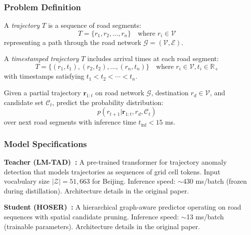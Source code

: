 \subsubsection{Problem Definition}
\label{sec:method-problem}

\begin{definition}[Trajectory]
\label{def:trajectory}
A \emph{trajectory} $T$ is a sequence of road segments:
\[
T = \{r_1, r_2, \ldots, r_n\} \quad \text{where } r_i \in \mathcal{V}
\]
representing a path through the road network $\mathcal{G} = (\mathcal{V}, \mathcal{E})$.
\end{definition}

\begin{definition}
\label{def:trajectory-timestamped}
A \emph{timestamped trajectory} $T$ includes arrival times at each road segment:
\[
T = \{(r_1, t_1), (r_2, t_2), \ldots, (r_n, t_n)\} \quad \text{where } r_i \in \mathcal{V}, t_i \in \mathbb{R}_+
\]
with timestamps satisfying $t_1 < t_2 < \cdots < t_n$.
\end{definition}

\begin{definition}
\label{def:trajectory-prediction}
Given a partial trajectory $\mathbf{r}_{1:t}$ on road network $\mathcal{G}$, destination $r_d \in \mathcal{V}$, and candidate set $\mathcal{C}_t$, predict the probability distribution:
\[
p(r_{t+1} | \mathbf{r}_{1:t}, r_d, \mathcal{C}_t)
\]
over next road segments with inference time $t_{\text{inf}} < 15$ ms.
\end{definition}

\subsubsection{Model Specifications}
\label{sec:method-models}

\textbf{Teacher (LM-TAD)~\cite{mbuyaTrajectoryAnomalyDetection2024}:} A pre-trained transformer for trajectory anomaly detection that models trajectories as sequences of grid cell tokens. Input vocabulary size $|\mathcal{Z}| = 51{,}663$ for Beijing. Inference speed: $\sim$430 ms/batch (frozen during distillation). Architecture details in the original paper.

\textbf{Student (HOSER)~\cite{caoHolisticSemanticRepresentation2025}:} A hierarchical graph-aware predictor operating on road sequences with spatial candidate pruning. Inference speed: $\sim$13 ms/batch (trainable parameters). Architecture details in the original paper.

